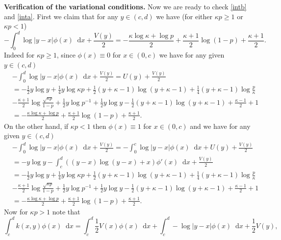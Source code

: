 \documentclass[reqno,11pt]{amsart}
\numberwithin{equation}{section}
\theoremstyle{definition}
\newcommand*\diff{\mathop{}\!\mathrm{d}}
\begin{document}
\noindent\textbf{Verification of the variational conditions.}
Now we are ready to check \eqref{intb} and \eqref{inta}. First we claim that for any $y\in (c,d)$ we have (for either $\kappa p\geq 1$ or $\kappa p< 1$)
\begin{equation}\label{eq:varitional_cond}
    -\int_0^d \log|y-x|\phi(x)\diff x+\frac{V(y)}{2} = -\frac{\kappa\log \kappa+\log p}{2}+\frac{\kappa+1}{2}\log(1-p)+\frac{\kappa+1}{2}.
\end{equation}
Indeed for $\kappa p\geq 1$, since $\phi(x)\equiv 0$ for $x\in (0,c)$ we have for any given $y\in (c,d)$
\begin{equation*}
    \begin{aligned}
      &-\int_0^d \log|y-x|\phi(x)\diff x+\frac{V(y)}{2}= U(y)+\frac{V(y)}{2}\\
      &= -\frac{1}{2}y\log y+\frac{1}{4}y\log \kappa p+\frac{1}{2}(y+\kappa-1)\log (y+\kappa-1)+\frac{1}{4}(y+\kappa-1)\log \frac{p}{\kappa}\\
      &-\frac{\kappa+1}{2}\log \frac{\sqrt{\kappa p}}{1-p}+\frac{1}{2}y\log p^{-1}+\frac{1}{2}y\log y -\frac{1}{2}(y+\kappa-1)\log(y+\kappa-1)+\frac{\kappa-1}{2}+1\\
      &= -\frac{\kappa\log \kappa+\log p}{2}+\frac{\kappa+1}{2}\log(1-p)+\frac{\kappa+1}{2}.
    \end{aligned}
\end{equation*}
On the other hand, if $\kappa p<1$ then $\phi(x)\equiv 1$ for $x\in (0,c)$ and we have for any given $y\in (c,d)$
\begin{equation*}
    \begin{aligned}
        &-\int_0^d \log|y-x|\phi(x)\diff x+\frac{V(y)}{2} = -\int_0^c \log|y-x|\phi(x)\diff x+U(y)+ \frac{V(y)}{2}\\
        & = -y\log y -\int_{c}^{d}\left((y-x)\log(y-x)+x\right)\phi'(x)\diff x +\frac{V(y)}{2}\\
        &= -\frac{1}{2}y\log y+\frac{1}{4}y\log \kappa p+\frac{1}{2}(y+\kappa-1)\log (y+\kappa-1)+\frac{1}{4}(y+\kappa-1)\log \frac{p}{\kappa}\\
      &-\frac{\kappa+1}{2}\log \frac{\sqrt{\kappa p}}{1-p}+\frac{1}{2}y\log p^{-1}+\frac{1}{2}y\log y -\frac{1}{2}(y+\kappa-1)\log(y+\kappa-1)+\frac{\kappa-1}{2}+1\\
      &= -\frac{\kappa\log \kappa+\log p}{2}+\frac{\kappa+1}{2}\log(1-p)+\frac{\kappa+1}{2}.
    \end{aligned}
\end{equation*}
Now for $\kappa p>1$ note that 
\begin{equation*}
    \int_c^d k(x,y)\phi(x)\diff x = \int_c^d \frac{1}{2}V(x)\phi(x)\diff x+\int_c^d -\log|y-x|\phi(x)\diff x+\frac{1}{2}V(y), 
\end{equation*}
\end{document}
